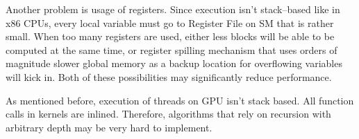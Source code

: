 Another problem is usage of registers. Since execution isn't stack--based like
in x86 CPUs, every local variable must go to Register File on SM that is rather
small. When too many registers are used, either less blocks will be able to
be computed at the same time, or register spilling mechanism that uses orders
of magnitude slower global memory as a backup location for overflowing variables
will kick in. Both of these possibilities may significantly reduce performance.

As mentioned before, execution of threads on GPU isn't stack based. All function
calls in kernels are inlined. Therefore, algorithms that rely on recursion with
arbitrary depth may be very hard to implement.
